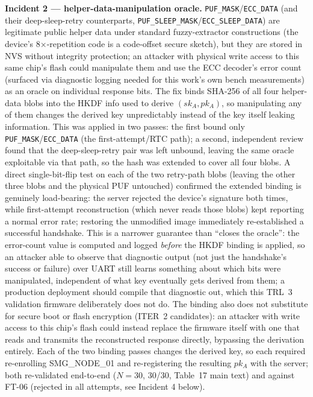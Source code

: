 \documentclass[12pt]{article}
\begin{document}
\textbf{Incident 2 --- helper-data-manipulation oracle.} \texttt{PUF\_MASK}/\texttt{ECC\_DATA} (and their deep-sleep-retry counterparts, \texttt{PUF\_SLEEP\_MASK}/\texttt{ECC\_SLEEP\_DATA}) are legitimate public helper data under standard fuzzy-extractor constructions (the device's 8$\times$-repetition code is a code-offset secure sketch), but they are stored in NVS without integrity protection; an attacker with physical write access to this same chip's flash could manipulate them and use the ECC decoder's error count (surfaced via diagnostic logging needed for this work's own bench measurements) as an oracle on individual response bits. The fix binds SHA-256 of all four helper-data blobs into the HKDF info used to derive $(sk_A, pk_A)$, so manipulating any of them changes the derived key unpredictably instead of the key itself leaking information. This was applied in two passes: the first bound only \texttt{PUF\_MASK}/\texttt{ECC\_DATA} (the first-attempt/RTC path); a second, independent review found that the deep-sleep-retry pair was left unbound, leaving the same oracle exploitable via that path, so the hash was extended to cover all four blobs. A direct single-bit-flip test on each of the two retry-path blobs (leaving the other three blobs and the physical PUF untouched) confirmed the extended binding is genuinely load-bearing: the server rejected the device's signature both times, while first-attempt reconstruction (which never reads those blobs) kept reporting a normal error rate; restoring the unmodified image immediately re-established a successful handshake. This is a narrower guarantee than ``closes the oracle'': the error-count value is computed and logged \emph{before} the HKDF binding is applied, so an attacker able to observe that diagnostic output (not just the handshake's success or failure) over UART still learns something about which bits were manipulated, independent of what key eventually gets derived from them; a production deployment should compile that diagnostic out, which this TRL~3 validation firmware deliberately does not do. The binding also does not substitute for secure boot or flash encryption (ITER~2 candidates): an attacker with write access to this chip's flash could instead replace the firmware itself with one that reads and transmits the reconstructed response directly, bypassing the derivation entirely. Each of the two binding passes changes the derived key, so each required re-enrolling SMG\_NODE\_01 and re-registering the resulting $pk_A$ with the server; both re-validated end-to-end ($N=30$, 30/30, Table~17 main text) and against FT-06 (rejected in all attempts, see Incident 4 below).
\end{document}
